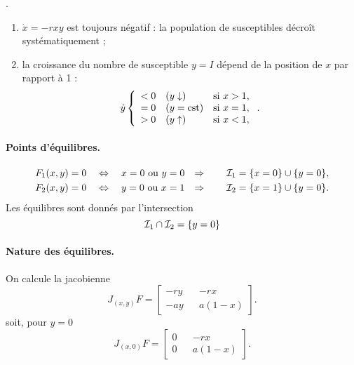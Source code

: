 \remark.
\begin{enumerate}[$a$)]
  \item $\dot x = - rxy$ est toujours négatif : la population de susceptibles décroît systématiquement ; 
  \item la croissance du nombre de susceptible $y = I$ dépend de la position de $x$ par rapport à 1 :
  $$
  \dot y \left\{\begin{array}{lll}
                < 0 & (y \downarrow) & \text{si } x > 1, \\
                = 0  & (y = \text{cst}) & \text{si } x = 1, \\
                > 0  & (y \uparrow) & \text{si } x < 1,
                \end{array}\right..
  $$
\end{enumerate}


\paragraph*{Points d'équilibres.}
\begin{align*}
  F_1(x, y) & = 0 \quad \Leftrightarrow \quad x = 0 \text{ ou } y = 0 &
  \Rightarrow \qquad \mathcal{I}_1 & = \{x = 0\} \cup \{y = 0\}, \\
  F_2(x, y) & = 0 \quad \Leftrightarrow \quad y = 0 \text{ ou } x = 1 &
  \Rightarrow \qquad \mathcal{I}_2 & = \{x = 1\} \cup \{y = 0\}.
\end{align*}
Les équilibres sont donnés par l'intersection 
$$
\mathcal{I}_1 \cap \mathcal{I}_2 = \{y = 0\}
$$

\paragraph*{Nature des équilibres.}
On calcule la jacobienne
$$
J_{(x, y)}F = 
  \left[\begin{array}{ccc} 
    - r y & & -r x \\
    - a y & & a (1 - x)
  \end{array}\right].
$$
soit, pour $y = 0$
$$
J_{(x, 0)}F = 
  \left[\begin{array}{ccc} 
    0 & & -r x \\
    0 & & a (1 - x)
  \end{array}\right].
$$

